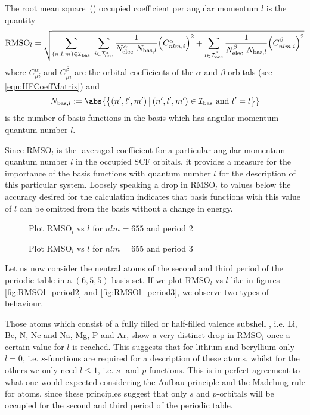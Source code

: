 \defineabbr{RMS}{RMS\xspace}{root mean square}
\newcommand{\RMSOl}{\text{RMSO}_l}
\begin{defn}
	The root mean square~(\RMS) occupied coefficient per angular momentum $l$
	is the quantity
	\begin{equation}
	\RMSOl =
		\sqrt{
		\sum_{(n,l,m) \in \Ibas} \
		\sum_{i \in \IoccA} \frac{1}{\NelecA \ N_{\text{bas}, l}}
			\Big(C^\alpha_{nlm, i} \Big)^2
			+ \sum_{i \in \IoccB} \frac{1}{\NelecB \ N_{\text{bas}, l}}
			\Big( C^\beta_{nlm, i} \Big)^2
		}
		\label{eqn:DefRMSOl}
	\end{equation}
	where $C^\alpha_{\mu i}$ and $C^\beta_{\mu i}$
	are the orbital coefficients of the $\alpha$ and $\beta$ orbitals
	(see \eqref{eqn:HFCoeffMatrix})
	and
	\[
		N_{\text{bas}, l} := \abs{ \left\{ (n',l',m') \, \big|\, (n',l',m') \in \Ibas
			\ \text{and} \ l' = l \right\} }
	\]
	is the number of basis functions in the \CS basis which has angular momentum
	quantum number $l$.
\end{defn}
Since $\RMSOl$ is the \RMS-averaged coefficient for a particular angular
momentum quantum number $l$ in the occupied SCF orbitals,
it provides a measure for the importance of the \CS basis functions
with quantum number $l$ for the description of this particular system.
Loosely speaking a drop in $\RMSOl$ to values below the
accuracy desired for the calculation indicates that basis functions with
this value of $l$ can be omitted from the basis without a change in \HF energy.

\begin{figure}
	\centering
	\caption{Plot $\RMSOl$ vs $l$ for $nlm = 655$ and period 2}
	\label{fig:RMSOl_period2}
\end{figure}

\begin{figure}
	\centering
	\caption{Plot $\RMSOl$ vs $l$ for $nlm = 655$ and period 3}
	\label{fig:RMSOl_period3}
\end{figure}
Let us now consider the neutral atoms of the second and third period of
the periodic table in a $(6,5,5)$ \CS basis set.
If we plot $\RMSOl$ vs $l$ like in figures \vref{fig:RMSOl_period2}
and \vref{fig:RMSOl_period3}, we observe two types of behaviour.

Those atoms which consist of a fully filled or half-filled valence subshell
, i.e. Li, Be, N, Ne and Na, Mg, P and Ar,
show a very distinct drop in $\RMSOl$ once a certain value
for $l$ is reached.
This suggests that for lithium and beryllium only $l=0$,
i.e. $s$-functions are required for a description of these atoms,
whilst for the others we only need $l \leq 1$, i.e. $s$- and $p$-functions.
This is in perfect agreement to what one would expected
considering the Aufbau principle and the Madelung rule
for atoms,
since these principles suggest that only $s$ and $p$-orbitals will be
occupied for the second and third period of the periodic table.

